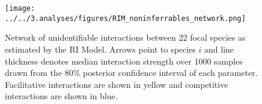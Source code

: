 \documentclass[a4,12pt]{article}
\begin{document}
    \begin{figure}[H]
        \texttt{[image: ../../3.analyses/figures/RIM\_noninferrables\_network.png]}
        \caption{Network of unidentifiable interactions between 22 focal species as estimated by the RI Model. Arrows point to species $i$ and line thickness denotes median interaction strength over 1000 samples drawn from the 80\% posterior confidence interval of each parameter. Facilitative interactions are shown in yellow and competitive interactions are shown in blue.}
        \label{fig:jointnetwork}
    \end{figure}
\end{document}

